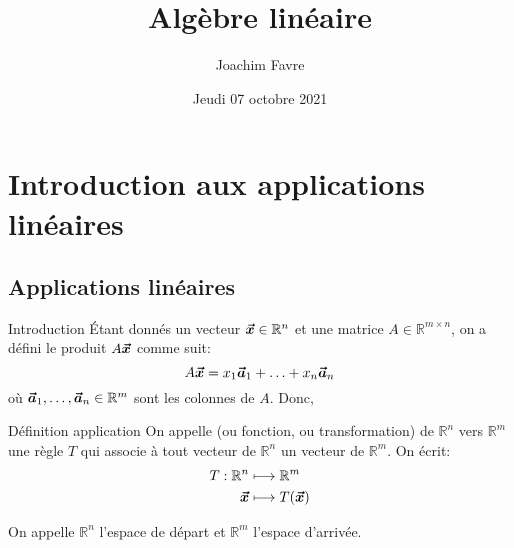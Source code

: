 \documentclass{article}
\title{Algèbre linéaire}
\author{Joachim Favre}
\date{Jeudi 07 octobre 2021}
\begin{document}
\maketitle



\section{Introduction aux applications linéaires}
\subsection{Applications linéaires}

\begin{parag}{Introduction}
    Étant donnés un vecteur $\bm{\protect\vec{x}} \in \mathbb{R}^{n}$ et une matrice $A \in \mathbb{R}^{m\times n}$, on a défini le produit $A \bm{\protect\vec{x}}$ comme suit:
    \[A \bm{\protect\vec{x}} = x_1 \bm{\protect\vec{a}}_1 + \ldots + x_n \bm{\protect\vec{a}}_n\]
    où $\bm{\protect\vec{a}}_1, \ldots, \bm{\protect\vec{a}}_n \in \mathbb{R}^m$ sont les colonnes de $A$. Donc, 
\end{parag}


\begin{parag}{Définition application}
    On appelle  (ou fonction, ou transformation) de $\mathbb{R}^{n}$ vers $\mathbb{R}^{m}$ une règle $T$ qui associe à tout vecteur de $\mathbb{R}^{n}$ un vecteur de $\mathbb{R}^{m}$. On écrit:
    \[\begin{split}
    T: \mathbb{R}^{n} &\longmapsto \mathbb{R}^{m} \\
    \bvec{x} &\longmapsto T\left(\bvec{x}\right)
    \end{split}\]

    On appelle $\mathbb{R}^{n}$ l'espace de départ et $\mathbb{R}^{m}$ l'espace d'arrivée.

\end{parag}
\end{document}
